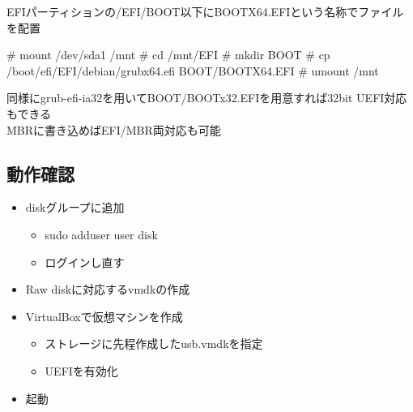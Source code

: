 \documentclass[mingoth,a4paper]{jsarticle}
\begin{document}
EFIパーティションの/EFI/BOOT以下にBOOTX64.EFIという名称でファイルを配置
\begin{commandline}
# mount /dev/sda1 /mnt
# cd /mnt/EFI
# mkdir BOOT
# cp /boot/efi/EFI/debian/grubx64.efi BOOT/BOOTX64.EFI
# umount /mnt
\end{commandline}
同様にgrub-efi-ia32を用いてBOOT/BOOTx32.EFIを用意すれば32bit UEFI対応もできる
\\
MBRに書き込めばEFI/MBR両対応も可能

\subsection{動作確認}

  \begin{itemize}
  \item diskグループに追加
    \begin{itemize}
    \item sudo adduser user disk
    \item ログインし直す
    \end{itemize}
  \item Raw diskに対応するvmdkの作成
  \item VirtualBoxで仮想マシンを作成
    \begin{itemize}
    \item ストレージに先程作成したusb.vmdkを指定
    \item UEFIを有効化
    \end{itemize}
  \item 起動
  \end{itemize}
\end{document}
